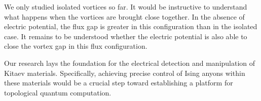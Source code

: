We only studied isolated vortices so far. It would be instructive to understand what happens when the vortices are brought close together.
In the absence of electric potential, the flux gap is greater in this configuration than in the isolated case.  It remains to be understood whether the electric potential is also able to close the vortex gap in this flux configuration.


Our research lays the foundation for the electrical detection and manipulation of Kitaev materials. Specifically, achieving precise control of Ising anyons within these materials would be a crucial step toward establishing a platform for topological quantum computation.

